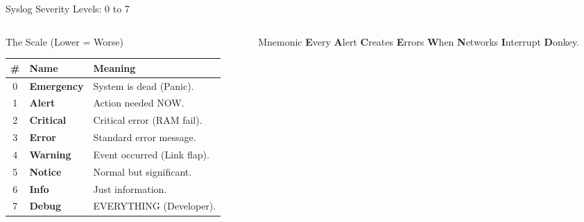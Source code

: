 \documentclass[aspectratio=169]{beamer}  %
\begin{document}
\begin{frame}{Syslog Severity Levels: 0 to 7}
    \begin{columns}[T]
        \begin{column}{0.55\textwidth}
            \begin{block}{The Scale (Lower = Worse)}
                \scriptsize
                \begin{tabular}{@{}c l l@{}}
                    \toprule
                    \textbf{\#} & \textbf{Name} & \textbf{Meaning} \\
                    \midrule
                    \rowcolor{alertred!30} 0 & \textbf{Emergency} & System is dead (Panic). \\
                    \rowcolor{alertred!20} 1 & \textbf{Alert} & Action needed NOW. \\
                    \rowcolor{alertred!10} 2 & \textbf{Critical} & Critical error (RAM fail). \\
                    \rowcolor{orange!10} 3 & \textbf{Error} & Standard error message. \\
                    \rowcolor{yellow!10} 4 & \textbf{Warning} & Event occurred (Link flap). \\
                    5 & \textbf{Notice} & Normal but significant. \\
                    6 & \textbf{Info} & Just information. \\
                    7 & \textbf{Debug} & EVERYTHING (Developer). \\
                    \bottomrule
                \end{tabular}
            \end{block}
        \end{column}
        \begin{column}{0.42\textwidth}
            \begin{exampleblock}{Mnemonic}
                \footnotesize
                \textbf{E}very \textbf{A}lert \textbf{C}reates \textbf{E}rrors \textbf{W}hen \textbf{N}etworks \textbf{I}nterrupt \textbf{D}onkey.
            \end{exampleblock}
            \begin{center}
\end{center}
\end{column}
\end{columns}
\end{frame}
\end{document}

